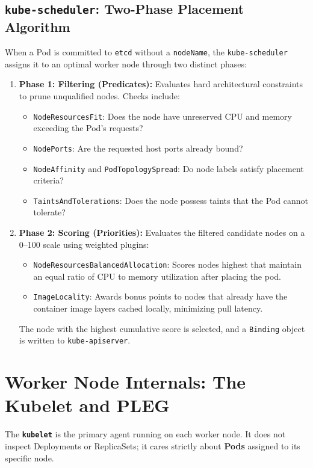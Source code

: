 \subsection{\texttt{kube-scheduler}: Two-Phase Placement Algorithm}
When a Pod is committed to \texttt{etcd} without a \texttt{nodeName}, the \texttt{kube-scheduler} assigns it to an optimal worker node through two distinct phases:
\begin{enumerate}[leftmargin=15pt]
  \item \textbf{Phase 1: Filtering (Predicates):} Evaluates hard architectural constraints to prune unqualified nodes. Checks include:
  \begin{itemize}[leftmargin=10pt]
    \item \texttt{NodeResourcesFit}: Does the node have unreserved CPU and memory exceeding the Pod's requests?
    \item \texttt{NodePorts}: Are the requested host ports already bound?
    \item \texttt{NodeAffinity} and \texttt{PodTopologySpread}: Do node labels satisfy placement criteria?
    \item \texttt{TaintsAndTolerations}: Does the node possess taints that the Pod cannot tolerate?
  \end{itemize}
  \item \textbf{Phase 2: Scoring (Priorities):} Evaluates the filtered candidate nodes on a 0--100 scale using weighted plugins:
  \begin{itemize}[leftmargin=10pt]
    \item \texttt{NodeResourcesBalancedAllocation}: Scores nodes highest that maintain an equal ratio of CPU to memory utilization after placing the pod.
    \item \texttt{ImageLocality}: Awards bonus points to nodes that already have the container image layers cached locally, minimizing pull latency.
  \end{itemize}
  The node with the highest cumulative score is selected, and a \texttt{Binding} object is written to \texttt{kube-apiserver}.
\end{enumerate}

\section{Worker Node Internals: The Kubelet and PLEG}

The \textbf{\texttt{kubelet}} is the primary agent running on each worker node. It does not inspect Deployments or ReplicaSets; it cares strictly about \textbf{Pods} assigned to its specific node.

